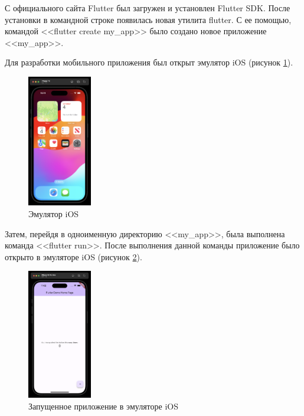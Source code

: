 \documentclass[a4paper, 14pt]{extarticle}
\begin{document}
С официального сайта Flutter был загружен и установлен Flutter SDK. После
установки в командной строке появилась новая утилита flutter. С ее помощью,
командой <<\foreignlanguage{english}{flutter create my\_app}>> было создано
новое приложение <<\foreignlanguage{english}{my\_app}>>.

Для разработки мобильного приложения был открыт эмулятор iOS (рисунок
\ref{fig:task-1-1}).

\begin{figure}[H]
  \centering
  \includegraphics[width=0.25\textwidth]{images/task-1/1.png}
  \caption{Эмулятор iOS}
  \label{fig:task-1-1}
\end{figure}

Затем, перейдя в одноименную директорию <<\foreignlanguage{english}{my\_app}>>,
была выполнена команда <<\foreignlanguage{english}{flutter run}>>. После
выполнения данной команды приложение было открыто в эмуляторе iOS (рисунок
\ref{fig:task-1-2}).

\begin{figure}[H]
  \centering
  \includegraphics[width=0.25\textwidth]{images/task-1/2.png}
  \caption{Запущенное приложение в эмуляторе iOS}
  \label{fig:task-1-2}
\end{figure}
\end{document}
